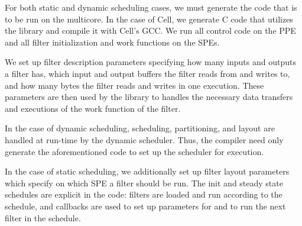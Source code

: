 For both static and dynamic scheduling cases, we must generate the code that
is to be run on the multicore. In the case of Cell, we generate C
code that utilizes the library and compile it with Cell's GCC. We run all
control code on the PPE and all filter initialization and work functions on the SPEs. 

We set up filter description parameters
specifying how many inputs and outputs a filter has, which input and output
buffers the filter reads from and writes to, and how many bytes the filter 
reads and writes in one execution. These parameters are then used by the
library to handles the necessary data transfers and executions of the
work function of the filter. 

In the case of dynamic scheduling, scheduling, partitioning, and layout
are handled at run-time by the dynamic scheduler. Thus, the compiler need only
generate the aforementioned code to set up the scheduler for execution.

In the case of static scheduling, we additionally set up filter layout parameters
which specify on which SPE a filter should be run. The init and steady state
schedules are explicit in the code: filters are loaded and run according to the
schedule, and callbacks are used to set up parameters for and to run the next filter in
the schedule.
